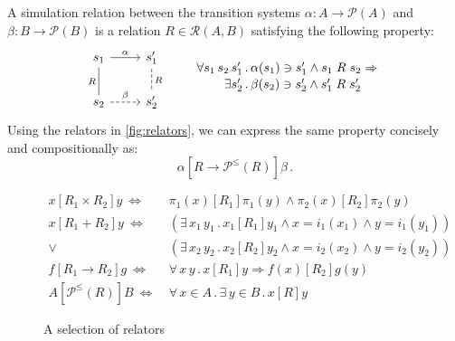 \documentclass[sigplan,10pt,review]{acmart}
\newcommand{\figsize}{\small}
\newcommand{\ifr}[1]{\mathrel{[{#1}]}}
\begin{document}
\begin{example} \label{ex:simrel} %
A simulation relation
between the transition systems
$\alpha : A \rightarrow \mathcal{P}(A)$ and
$\beta : B \rightarrow \mathcal{P}(B)$
is a relation $R \in \mathcal{R}(A, B)$
satisfying the following property:
\[
  \begin{tikzcd}[scale=0.8]
    s_1 \arrow[r, "\alpha"]
        \arrow[d, dash, "R"'] &
    s_1' \arrow[d, dashed, dash, "R"] \\
    s_2 \arrow[r, dashed, "\beta"] &
    s_2'
  \end{tikzcd}
  \qquad
  \label{eqn:simrel}
  \begin{array}{r@{\,.\,}l}
    \forall s_1 \, s_2 \, s_1' &
      \alpha(s_1) \ni s_1' \wedge s_1 \mathrel{R} s_2 \Rightarrow
    \\[0.25ex]
    \exists s_2' &
      \beta(s_2) \ni s_2' \wedge s_1' \mathrel{R} s_2'
  \end{array}
\]
Using the relators in \autoref{fig:relators},
we can express the same property
concisely and compositionally as:
\[
  \alpha \ifr{R \rightarrow \mathcal{P}^\le(R)} \beta \,.
\]
\end{example}

\begin{figure} %
  \figsize
  \begin{align*}
    x \ifr{R_1 \times R_2} y \ \Leftrightarrow\  &
      \pi_1(x) \ifr{R_1} \pi_1(y) \wedge
      \pi_2(x) \ifr{R_2} \pi_2(y) \\
    x \ifr{R_1 + R_2} y \ \Leftrightarrow\  &
      (\exists \, x_1 \, y_1 \,.\,
        x_1 \ifr{R_1} y_1 \wedge
        x = i_1(x_1) \wedge
        y = i_1(y_1)) \\ \vee\ &
      (\exists \, x_2 \, y_2 \,.\,
        x_2 \ifr{R_2} y_2 \wedge
        x = i_2(x_2) \wedge
        y = i_2(y_2)) \\
    f \ifr{R_1 \rightarrow R_2} g \ \Leftrightarrow\  &
      \forall \, x \, y \,.\,
        x \ifr{R_1} y \Rightarrow
        f(x) \ifr{R_2} g(y) \\
    A \ifr{\mathcal{P}^\le(R)} B \ \Leftrightarrow\  &
      \forall \, x \in A \,.\,
      \exists \, y \in B \,.\,
      x \ifr{R} y
  \end{align*}
  \caption{A selection of relators}
  \label{fig:relators}
\end{figure}

\end{document}
